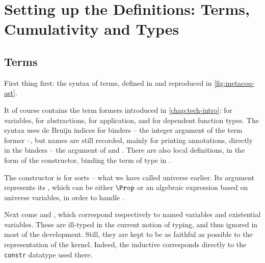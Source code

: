 \section[Terms, Cumulativity and Types]{Setting up the Definitions: Terms, Cumulativity and Types}
\label{sec:meta-defs}

\subsection{Terms}

First thing first: the syntax of terms, defined in  and reproduced in \cref{fig:metacoq-ast}.

\begin{figure*}
  \caption{The Abstract Syntax Tree of terms in  ()}
  \label{fig:metacoq-ast}
\end{figure*}

It of course contains  the term formers introduced in \cref{chap:tech-intro}:
 for variables,  for abstractions,
 for application, and  for dependent function types.
The syntax uses de Bruijn indices for binders – the integer argument of the 
term former –, but names are still recorded, mainly for printing annotations, directly in the
binders – the  argument of  and .
There are also local definitions, in the form of the  constructor,
binding the term  of type  in .

The  constructor is for sorts – what we have called universe earlier.
Its argument  represents its , which can be either $\Prop$
or an algebraic expression based on universe variables, in order to handle .

Next come  and , which
correspond respectively to named variables and existential variables.
These are ill-typed in the current notion of typing,
and thus ignored in most of the development. Still, they are kept to be as
faithful as possible to the representation of the  kernel.
Indeed, the inductive  corresponds directly to the
\texttt{constr} datatype used there.%

